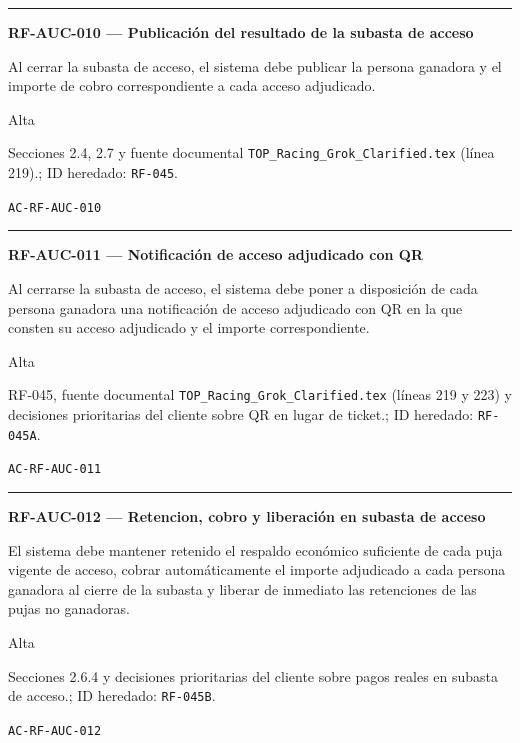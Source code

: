 \documentclass[10pt,letterpaper]{article}
\begin{document}
\vspace{0.25em}\hrule\vspace{0.65em}
\noindent\textbf{RF-AUC-010 --- Publicación del resultado de la subasta de acceso}\par
\begin{description}[style=nextline,leftmargin=3.15cm,labelwidth=2.8cm,font=\normalfont\bfseries]
\item[Obligación] Al cerrar la subasta de acceso, el sistema debe publicar la persona ganadora y el importe de cobro correspondiente a cada acceso adjudicado.
\item[Prioridad] Alta
\item[Procedencia] Secciones 2.4, 2.7 y fuente documental \texttt{TOP\_Racing\_Grok\_Clarified.tex} (línea 219).; ID heredado: \texttt{RF-045}.
\item[Verificación] \texttt{AC-RF-AUC-010}
\end{description}
\vspace{0.25em}\hrule\vspace{0.65em}
\noindent\textbf{RF-AUC-011 --- Notificación de acceso adjudicado con QR}\par
\begin{description}[style=nextline,leftmargin=3.15cm,labelwidth=2.8cm,font=\normalfont\bfseries]
\item[Obligación] Al cerrarse la subasta de acceso, el sistema debe poner a disposición de cada persona ganadora una notificación de acceso adjudicado con QR en la que consten su acceso adjudicado y el importe correspondiente.
\item[Prioridad] Alta
\item[Procedencia] RF-045, fuente documental \texttt{TOP\_Racing\_Grok\_Clarified.tex} (líneas 219 y 223) y decisiones prioritarias del cliente sobre QR en lugar de ticket.; ID heredado: \texttt{RF-045A}.
\item[Verificación] \texttt{AC-RF-AUC-011}
\end{description}
\vspace{0.25em}\hrule\vspace{0.65em}
\noindent\textbf{RF-AUC-012 --- Retencion, cobro y liberación en subasta de acceso}\par
\begin{description}[style=nextline,leftmargin=3.15cm,labelwidth=2.8cm,font=\normalfont\bfseries]
\item[Obligación] El sistema debe mantener retenido el respaldo económico suficiente de cada puja vigente de acceso, cobrar automáticamente el importe adjudicado a cada persona ganadora al cierre de la subasta y liberar de inmediato las retenciones de las pujas no ganadoras.
\item[Prioridad] Alta
\item[Procedencia] Secciones 2.6.4 y decisiones prioritarias del cliente sobre pagos reales en subasta de acceso.; ID heredado: \texttt{RF-045B}.
\item[Verificación] \texttt{AC-RF-AUC-012}
\end{description}
\end{document}
